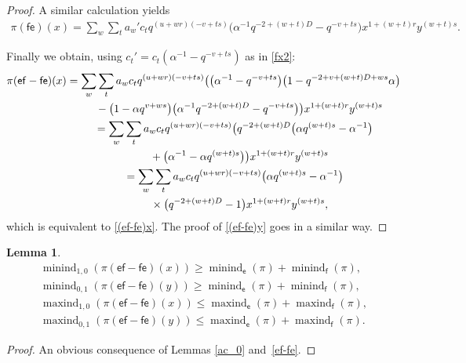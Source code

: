 \documentclass[pdftex]{sigma}
\numberwithin{equation}{section}
\newtheorem{Lemma}[Theorem]{Lemma}
\begin{document}
\begin{proof}
A similar calculation yields
\begin{gather*}
\pi(\mathsf{fe})(x)=\sum_w\sum_ta_w'c_tq^{(u+wr)(-v+ts)} \big(\alpha^{-1}q^{-2+(w+t)D}-q^{-v+ts}\big)x^{1+(w+t)r}y^{(w+t)s}.
\end{gather*}

Finally we obtain, using $c_t'=c_t(\alpha^{-1}-q^{-v+ts})$ as in \eqref{fx2}:
\begin{gather*}
\pi(\mathsf{ef-fe})(x)=\sum_w\sum_ta_wc_tq^{(u+wr)(-v+ts)} \big(\big(\alpha^{-1}-q^{-v+ts}\big)\big(1-q^{-2+v+(w+t)D+ws}\alpha\big)\\
\hphantom{\pi(\mathsf{ef-fe})(x)=}{} -\big(1-\alpha q^{v+ws}\big)\big(\alpha^{-1}q^{-2+(w+t)D}-q^{-v+ts}\big)\big)x^{1+(w+t)r}y^{(w+t)s}\\
\hphantom{\pi(\mathsf{ef-fe})(x)}{}=\sum_w\sum_ta_wc_tq^{(u+wr)(-v+ts)} \big(q^{-2+(w+t)D}\big(\alpha q^{(w+t)s}-\alpha^{-1}\big)\\
\hphantom{\pi(\mathsf{ef-fe})(x)=}{} +\big(\alpha^{-1}-\alpha q^{(w+t)s}\big)\big)x^{1+(w+t)r}y^{(w+t)s}\\
\hphantom{\pi(\mathsf{ef-fe})(x)}{} =\sum_w\sum_ta_wc_tq^{(u+wr)(-v+ts)}\big(\alpha q^{(w+t)s}-\alpha^{-1}\big)\\
\hphantom{\pi(\mathsf{ef-fe})(x)=}{} \times \big(q^{-2+(w+t)D}-1\big)x^{1+(w+t)r}y^{(w+t)s},
\end{gather*}
which is equivalent to \eqref{(ef-fe)x}. The proof of \eqref{(ef-fe)y} goes in a similar way.
\end{proof}

\begin{Lemma}\label{extr_(ef-fe)}
\begin{gather*}
\operatorname{minind}_{1,0}(\pi(\mathsf{ef}-\mathsf{fe})(x)) \ge\operatorname{minind}_\mathsf{e}(\pi)+\operatorname{minind}_\mathsf{f}(\pi),\\
\operatorname{minind}_{0,1}(\pi(\mathsf{ef}-\mathsf{fe})(y)) \ge\operatorname{minind}_\mathsf{e}(\pi)+\operatorname{minind}_\mathsf{f}(\pi),\\
\operatorname{maxind}_{1,0}(\pi(\mathsf{ef}-\mathsf{fe})(x)) \le\operatorname{maxind}_\mathsf{e}(\pi)+\operatorname{maxind}_\mathsf{f}(\pi),\\
\operatorname{maxind}_{0,1}(\pi(\mathsf{ef}-\mathsf{fe})(y)) \le\operatorname{maxind}_\mathsf{e}(\pi)+\operatorname{maxind}_\mathsf{f}(\pi).
\end{gather*}
\end{Lemma}

\begin{proof} An obvious consequence of Lemmas \ref{ac_0} and~\ref{ef-fe}.
\end{proof}
\end{document}
